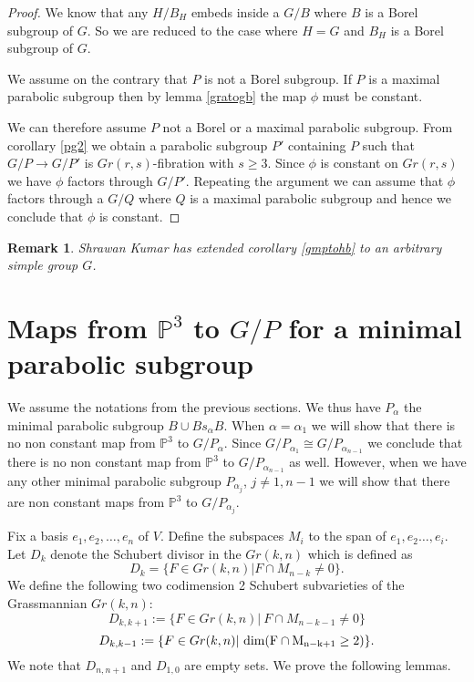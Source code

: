 \documentclass[a4paper,11pt]{amsart}
\newtheorem{remark}[theorem]{Remark}
\begin{document}
\begin{proof} We know that any $H/B_H$ embeds inside a $G/B$ where $B$ is a Borel subgroup of $G$. So we are reduced to the case where $H =G$ and $B_H$ is a Borel subgroup of $G$.

We assume on the contrary that $P$ is not a Borel subgroup. If $P$ is a maximal parabolic subgroup then by lemma \ref{gratogb} the map $\phi$ must be constant.

We can therefore assume $P$ not a Borel or a maximal parabolic subgroup. From corollary \ref{pg2} we obtain a parabolic subgroup $P'$ containing $P$ such that $G/P \rightarrow G/P'$ is $Gr(r,s)$-fibration with $s \geq 3$. Since $\phi$ is constant on $Gr(r,s)$ we have $\phi$ factors through $G/P'$. Repeating the argument we can assume that $\phi$ factors through a $G/Q$ where $Q$ is a maximal parabolic subgroup and hence we conclude that $\phi$ is constant.

\end{proof}

\begin{remark}  Shrawan Kumar \cite{kumarsconj} has extended corollary \ref{gmptohb} to an arbitrary simple group $G$. 
\end{remark}

\section{Maps from $\mathbb{P}^3$ to $G/P$ for a minimal parabolic subgroup}


We assume the notations from the previous sections. We thus have $P_{\alpha}$ the minimal parabolic subgroup $B \cup Bs_{\alpha}B$. When $\alpha = \alpha_1$ we will show that there is no non constant map from $\mathbb{P}^3$ to $G/{P_{\alpha}}$. Since $G/P_{\alpha_1} \cong G/P_{\alpha_{n-1}}$ we conclude that there is no non constant map from $\mathbb{P}^3$ to $G/{P_{\alpha_{n-1}}}$ as well.  However, when we have any other minimal parabolic subgroup $P_{\alpha_{j}}$, $j\neq 1,n-1$ we will show that there are non constant maps from $\mathbb{P}^3$ to $G/{P_{\alpha_j}}$. 


Fix a basis $e_1, e_2, \ldots, e_n$ of $V$. Define the subspaces $M_i$ to the span of $e_1, e_2 \ldots, e_i$. Let $D_k$ denote the Schubert divisor in the $Gr(k,n)$ which is defined as 
\[ D_k = \{ F \in Gr(k,n) | F \cap M_{n-k} \neq 0 \}. 
\] 
We define the following two codimension 2 Schubert subvarieties of the Grassmannian $Gr(k,n)$:  
\[ D_{k,k+1} := \{ F \in Gr(k,n) | ~F \cap M_{n-k-1} \neq 0 \} 
\] 
\[ D_{k,k-1} := \{ F \in Gr(k,n) | ~\rm{dim}(F \cap M_{n-k+1} \geq 2) \}.
\] 
We note that $D_{n,n+1}$ and $D_{1,0}$ are empty sets.
We prove the following lemmas.
\end{document}
